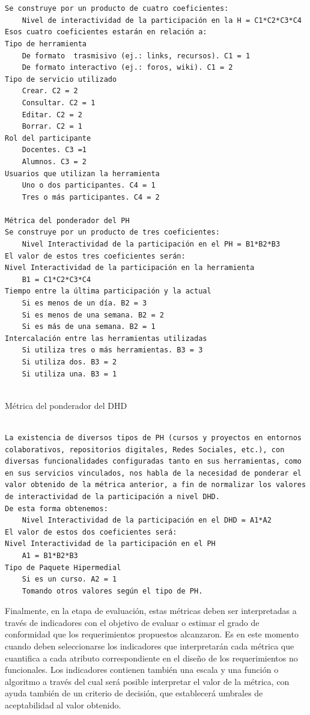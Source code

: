 \begin{verbatim}
 

Se construye por un producto de cuatro coeficientes:
	Nivel de interactividad de la participación en la H = C1*C2*C3*C4
Esos cuatro coeficientes estarán en relación a:
Tipo de herramienta
	De formato  trasmisivo (ej.: links, recursos). C1 = 1
	De formato interactivo (ej.: foros, wiki). C1 = 2
Tipo de servicio utilizado
	Crear. C2 = 2
	Consultar. C2 = 1
	Editar. C2 = 2
	Borrar. C2 = 1
Rol del participante
	Docentes. C3 =1
	Alumnos. C3 = 2
Usuarios que utilizan la herramienta
	Uno o dos participantes. C4 = 1
	Tres o más participantes. C4 = 2

Métrica del ponderador del PH
Se construye por un producto de tres coeficientes:
	Nivel Interactividad de la participación en el PH = B1*B2*B3
El valor de estos tres coeficientes serán:
Nivel Interactividad de la participación en la herramienta
	B1 = C1*C2*C3*C4
Tiempo entre la última participación y la actual
	Si es menos de un día. B2 = 3
	Si es menos de una semana. B2 = 2
	Si es más de una semana. B2 = 1
Intercalación entre las herramientas utilizadas
	Si utiliza tres o más herramientas. B3 = 3
	Si utiliza dos. B3 = 2
	Si utiliza una. B3 = 1


\end{verbatim} 


Métrica del ponderador del DHD


\begin{verbatim} 
 
La existencia de diversos tipos de PH (cursos y proyectos en entornos colaborativos, repositorios digitales, Redes Sociales, etc.), con diversas funcionalidades configuradas tanto en sus herramientas, como en sus servicios vinculados, nos habla de la necesidad de ponderar el valor obtenido de la métrica anterior, a fin de normalizar los valores de interactividad de la participación a nivel DHD. 
De esta forma obtenemos:
	Nivel Interactividad de la participación en el DHD = A1*A2
El valor de estos dos coeficientes será:
Nivel Interactividad de la participación en el PH
	A1 = B1*B2*B3
Tipo de Paquete Hipermedial
	Si es un curso. A2 = 1
	Tomando otros valores según el tipo de PH.
\end{verbatim}


Finalmente, en la etapa de evaluación, estas métricas deben ser interpretadas a través de indicadores con el objetivo de evaluar o estimar el grado de conformidad que los requerimientos propuestos alcanzaron. Es en este momento cuando deben seleccionarse los indicadores que interpretarán cada métrica que cuantifica a cada atributo correspondiente en el diseño de los requerimientos no funcionales. Los indicadores contienen también una escala y una función o algoritmo a través del cual será posible interpretar el valor de la métrica, con ayuda también de un criterio de decisión, que establecerá umbrales de aceptabilidad al valor obtenido.


